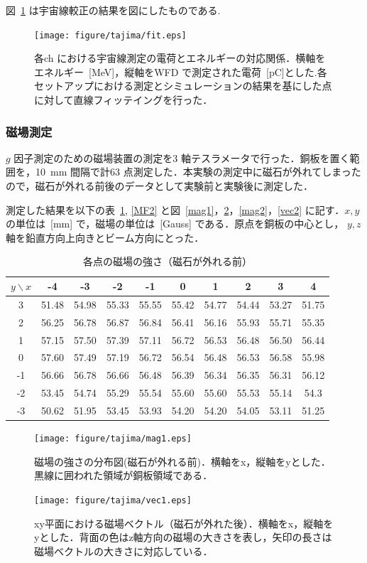 図~\ref{cali} は宇宙線較正の結果を図にしたものである.
\begin{figure}[H]
\centering
\texttt{[image: figure/tajima/fit.eps]}
\caption{各ch における宇宙線測定の電荷とエネルギーの対応関係．横軸をエネルギー~[MeV]，縦軸をWFD で測定された電荷~[pC]とした.各セットアップにおける測定とシミュレーションの結果を基にした点に対して直線フィッテイングを行った．}\label{cali}
\end{figure}

\newpage

\subsubsection{磁場測定}
$g$ 因子測定のための磁場装置の測定を3 軸テスラメータで行った．銅板を置く範囲を，10~mm 間隔で計63 点測定した．本実験の測定中に磁石が外れてしまったので，磁石が外れる前後のデータとして実験前と実験後に測定した．

測定した結果を以下の表~\ref{MF1}, \ref{MF2} と図~\ref{mag1}，\ref{vec1}，\ref{mag2}，\ref{vec2} に記す．$x, y$の単位は~[mm] で，磁場の単位は~[Gauss] である．原点を銅板の中心とし， $y, z$軸を鉛直方向上向きとビーム方向にとった．
\begin{table}[H]
\centering
\caption{各点の磁場の強さ（磁石が外れる前）}\label{MF1}
\begin{tabular}{|c||c|c|c|c|c|c|c|c|c|}\hline
$y \backslash x$ & -4 & -3 & -2 & -1 & 0 & 1 & 2 & 3 & 4 \\ \hline \hline
3 & 51.48 & 54.98 & 55.33 & 55.55 & 55.42 & 54.77 & 54.44 & 53.27 & 51.75 \\ \hline
2 & 56.25 & 56.78 & 56.87 & 56.84 & 56.41 & 56.16 & 55.93 & 55.71 & 55.35 \\ \hline
1 & 57.15 & 57.50 & 57.39 & 57.11 & 56.72 & 56.53 & 56.48 & 56.50 & 56.44 \\ \hline
0 & 57.60 & 57.49 & 57.19 & 56.72 & 56.54 & 56.48 & 56.53 & 56.58 & 55.98 \\ \hline
-1 & 56.66 & 56.78 & 56.66 & 56.48 & 56.39 & 56.34 & 56.35 & 56.31 & 56.12 \\ \hline
-2 & 53.45 & 54.74 & 55.29 & 55.54 & 55.60 & 55.60 & 55.53 & 55.14 & 54.3 \\ \hline
-3 & 50.62 & 51.95 & 53.45 & 53.93 & 54.20 & 54.20 & 54.05 & 53.11 & 51.25 \\ \hline
\end{tabular}
\end{table}
\begin{figure}[H]
\begin{minipage}{0.45\hsize}
\centering
\texttt{[image: figure/tajima/mag1.eps]}
\caption{磁場の強さの分布図(磁石が外れる前)．横軸をx，縦軸をyとした．黒線に囲われた領域が銅板領域である．}
\label{mag1}
\end{minipage}
\begin{minipage}{0.45\hsize}
\centering
\texttt{[image: figure/tajima/vec1.eps]}
\caption{xy平面における磁場ベクトル（磁石が外れた後）．横軸をx，縦軸をyとした．背面の色はz軸方向の磁場の大きさを表し，矢印の長さは磁場ベクトルの大きさに対応している．}
\label{vec1}
\end{minipage}
\end{figure}



